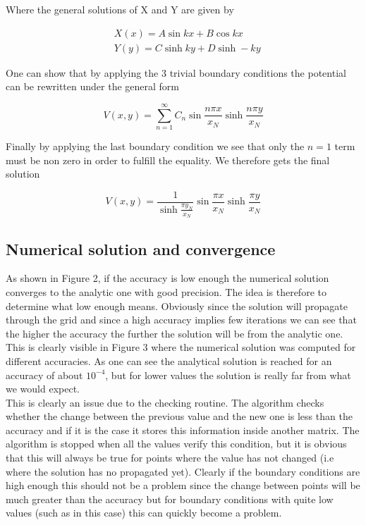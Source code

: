 \documentclass[10 pt]{article}
\numberwithin{equation}{section}
\begin{document}
\begin{multicols}{2}
Where the general solutions of X and Y are given by

\begin{equation}
\begin{split}
&X(x) = A \sin kx + B \cos kx\\
&Y(y) = C \sinh ky + D \sinh -ky
\end{split}
\end{equation}

One can show that by applying the 3 trivial boundary conditions the potential can be rewritten under the general form \cite{ComputationalPhysics}

\begin{equation}
V(x,y) = \sum\limits_{n=1}^{\infty} C_n \sin \frac{n\pi x}{x_N} \sinh \frac{n\pi y}{x_N}
\end{equation}

Finally by applying the last boundary condition we see that only the $n=1$ term must be non zero in order to fulfill the equality. We therefore gets the final solution

\begin{equation}
V(x,y) = \frac{1}{\sinh \frac{\pi y_N}{x_N}} \sin \frac{ \pi x}{x_N} \sinh \frac{\pi y}{x_N}
\end{equation}

\subsection{Numerical solution and convergence}

As shown in Figure 2, if the accuracy is low enough the numerical solution converges to the analytic one with good precision. The idea is therefore to determine what low enough means. Obviously since the solution will propagate through the grid and since a high accuracy  implies few iterations we can see that the higher the accuracy the further the solution will be from the analytic one. This is clearly visible in Figure 3 where the numerical solution was computed for different accuracies. As one can see the analytical solution is reached for an accuracy of about $10^{-4}$, but for lower values the solution is really far from what we would expect.\\
This is clearly an issue due to the checking routine. The algorithm checks whether the change between the previous value and the new one is less than the accuracy and if it is the case it stores this information inside another matrix. The algorithm is stopped when all the values verify this condition, but it is obvious that this will always be true for points where the value has not changed (i.e where the solution has no propagated yet). Clearly if the boundary conditions are high enough this should not be a problem since the change between points will be much greater than the accuracy but for boundary conditions with quite low values (such as in this case) this can quickly become a problem.

\end{multicols}
\end{document}
